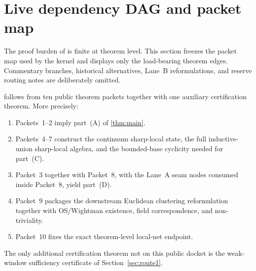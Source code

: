 \section{Live dependency DAG and packet map}\label{sec:kernel-spine}

The proof burden of  is finite at theorem level. This section freezes the packet map used by the kernel and displays only the load-bearing theorem edges. Commentary branches, historical alternatives, Lane~B reformulations, and reserve routing notes are deliberately omitted.

\begin{proposition}\label{prop:packet-reduction}
 follows from ten public theorem packets together with one auxiliary certification theorem. More precisely:
\begin{enumerate}[label=\textup{(\roman*)}]
    \item Packets~1--2 imply part~\textup{(A)} of \cref{thm:main}.
    \item Packets~4--7 construct the continuum sharp-local state, the full inductive-union sharp-local algebra, and the bounded-base cyclicity needed for part~\textup{(C)}.
    \item Packet~3 together with Packet~8, with the Lane~A seam nodes consumed inside Packet~8, yield part~\textup{(D)}.
    \item Packet~9 packages the downstream Euclidean clustering reformulation together with OS/Wightman existence, field correspondence, and non-triviality.
    \item Packet~10 fixes the exact theorem-level local-net endpoint.
\end{enumerate}
The only additional certification theorem not on this public docket is the weak-window sufficiency certificate of Section~\ref{sec:route1}.
\end{proposition}

